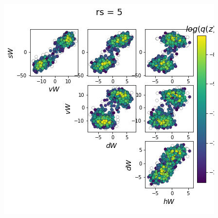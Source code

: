 \documentclass[11pt]{article}
\begin{document}
\begin{center}
\includegraphics[scale=0.33]{figs/Z_SC_reduced_c=0_p=50_rs=5.png}
\end{center}
\end{document}
